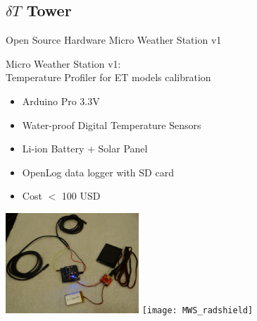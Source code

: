\documentclass[xcolor=dvipsnames,beamer]{beamer} %
\begin{document}
\subsection{ $\delta T$ Tower}
\begin{frame}[fragile]{Open Source Hardware Micro Weather Station v1}

Micro Weather Station v1:\\
Temperature Profiler for ET models calibration
\vspace{5mm}
\begin{itemize}
 \item Arduino Pro 3.3V
 \item Water-proof Digital Temperature Sensors
 \item Li-ion Battery + Solar Panel
 \item OpenLog data logger with SD card
 \item Cost $<$ 100 USD
\end{itemize}
\begin{flushright}
  \includegraphics[width=5cm]{MWS}
  \hspace{5mm}
  \texttt{[image: MWS\_radshield]}
\end{flushright}
\end{frame}
\end{document}
